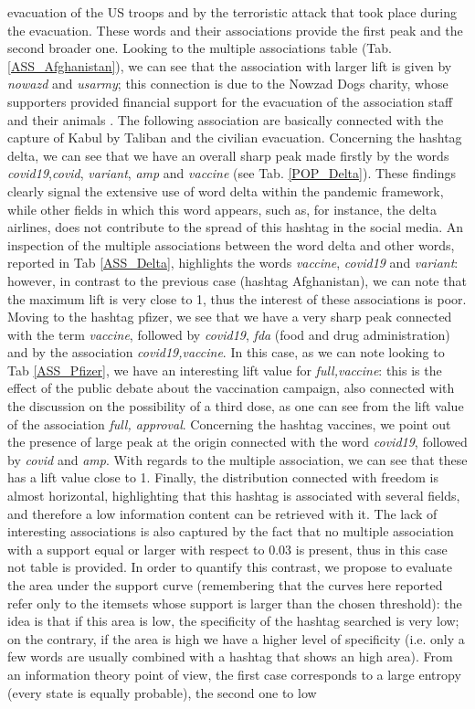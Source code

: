\documentclass[12pt,%
               a4paper,%
               oneside,openany,%
               titlepage,%
               headinclude,footinclude,%
               BCOR5mm,%
               cleardoublepage=empty,%
               tablecaptionabove,%
               floatperchapter,
               ]{scrreprt}                 %
\begin{document}
evacuation of the US troops and by the terroristic attack that took place during the evacuation. These words and their associations provide the first peak and the second broader one. Looking to the multiple associations table (Tab. \ref{ASS_Afghanistan}), we can see that the association with larger lift is given by \textit{nowazd} and \textit{usarmy}; this connection is due to the Nowzad Dogs charity, whose supporters provided financial support for the evacuation of the association staff and their animals \cite{Nowzad}. The following association are basically connected with the capture of Kabul by Taliban and the civilian evacuation. Concerning the hashtag delta, we can see that we have an overall sharp peak made firstly by the words \textit{covid19},\textit{covid}, \textit{variant}, \textit{amp} and \textit{vaccine} (see Tab. \ref{POP_Delta}). These findings clearly signal the extensive use of word delta within the pandemic framework, while other fields in which this word appears, such as, for instance, the delta airlines, does not contribute to the spread of this hashtag in the social media. An inspection of the multiple associations between the word delta and other words, reported in Tab \ref{ASS_Delta}, highlights the words \textit{vaccine}, \textit{covid19} and \textit{variant}: however, in contrast to the previous case (hashtag Afghanistan), we can note that the maximum lift is very close to 1, thus the interest of these associations is poor. Moving to the hashtag pfizer, we see that we have a very sharp peak connected with the term \textit{vaccine}, followed by \textit{covid19}, \textit{fda} (food and drug administration) and by the association \textit{covid19,vaccine}. In this case, as we can note looking to Tab \ref{ASS_Pfizer}, we have an interesting lift value for \textit{full,vaccine}: this is the effect of the public debate about the vaccination campaign, also connected with the discussion on the possibility of a third dose, as one can see from the lift value of the association \textit{full, approval}. Concerning the hashtag vaccines, we point out the presence of large peak at the origin connected with the word \textit{covid19}, followed by \textit{covid} and \textit{amp}. With regards to the multiple association, we can see that these has a lift value close to 1. Finally, the distribution connected with freedom is almost horizontal, highlighting that this hashtag is associated with several fields, and therefore a low information content can be retrieved with it. The lack of interesting associations is also captured by the fact that no multiple association with a support equal or larger with respect to 0.03 is present, thus in this case not table is provided. In order to quantify this contrast, we propose to evaluate the area under the support curve (remembering that the curves here reported refer only to the itemsets whose support is larger than the chosen threshold): the idea is that if this area is low, the specificity of the hashtag searched is very low; on the contrary, if the area is high we have a higher level of specificity (i.e. only a few words are usually combined with a hashtag that shows an high area). From an information theory point of view, the first case corresponds to a large entropy (every state is equally probable), the second one to low 
\end{document}
